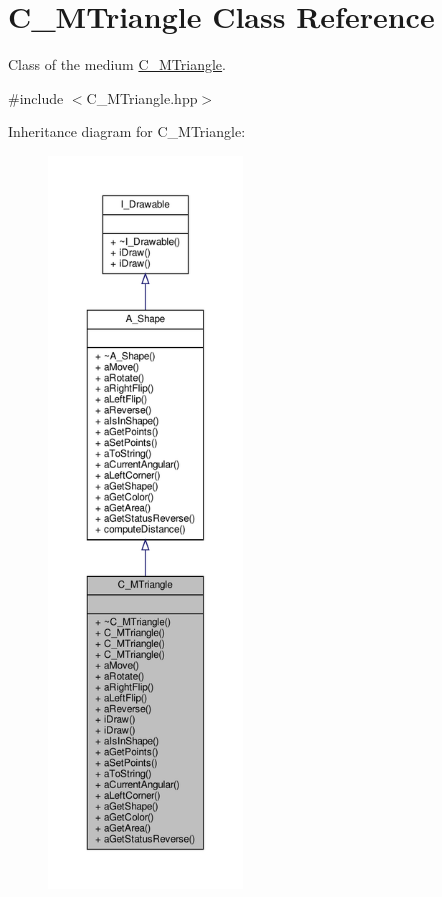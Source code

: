 \hypertarget{classC__MTriangle}{}\section{C\+\_\+\+M\+Triangle Class Reference}
\label{classC__MTriangle}


Class of the medium \hyperlink{classC__MTriangle}{C\+\_\+\+M\+Triangle}.  




{\ttfamily \#include $<$C\+\_\+\+M\+Triangle.\+hpp$>$}



Inheritance diagram for C\+\_\+\+M\+Triangle\+:
\nopagebreak
\begin{figure}[H]
\begin{center}
\leavevmode
\includegraphics[height=550pt]{classC__MTriangle__inherit__graph}
\end{center}
\end{figure}


